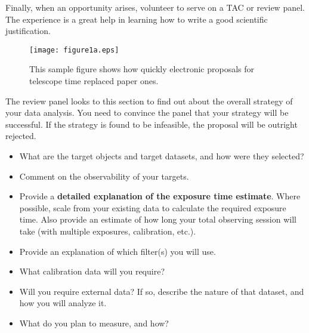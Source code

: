 \documentclass[11pt]{article}
\begin{document}
Finally, when an opportunity arises, volunteer to serve on
a TAC or review panel.  The experience is a great help in
learning how to write a good scientific justification.



\begin{figure}[hbt]
\texttt{[image: figure1a.eps]}
\caption{This sample figure shows how quickly electronic proposals
for telescope time replaced paper ones.}
\end{figure}


\clearpage


%

%

\expdesign
The review panel looks to this section to find out about the overall
strategy of your data analysis.  You need to convince the panel that your strategy will be successful.  If the strategy is found to be infeasible, the proposal will be outright rejected.

\begin{itemize}
  
\item
  What are the target objects and target datasets, and how were they selected?

\item
  Comment on the observability of your targets.

\item
  Provide a {\bf detailed explanation of the exposure time estimate}.  Where possible, scale from your existing data to calculate the required exposure time.  Also provide an estimate of how long your total observing session will take (with multiple exposures, calibration, etc.).

\item
  Provide an explanation of which filter(s) you will use.
  
\item
  What calibration data will you require?

\item
  Will you require external data?  If so, describe the nature of that dataset, and how you will analyze it.
  
\item
  What do you plan to measure, and how?

\end{itemize}
 
\end{document}
